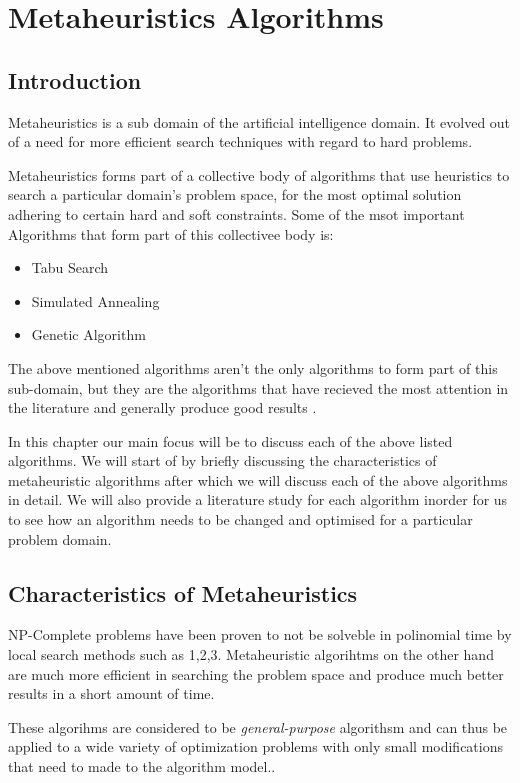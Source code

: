 \chapter{Metaheuristics Algorithms}

\section{Introduction}
Metaheuristics is a sub domain of the artificial intelligence domain. It evolved out of a need for more efficient search techniques with regard to hard problems. 

Metaheuristics forms part of a collective body of algorithms that use heuristics to search a particular domain's problem space, for the most optimal solution adhering to certain hard and soft constraints. Some of the msot important Algorithms that form part of this collectivee body is:
\begin{itemize}
\item Tabu Search
\item Simulated Annealing
\item Genetic Algorithm
\end{itemize}
The above mentioned algorithms aren't the only algorithms to form part of this sub-domain, but they are the algorithms that have recieved the most attention in the literature and generally produce good results \cite{SweepMeta}.

In this chapter our main focus will be to discuss each of the above listed algorithms. We will start of by briefly discussing the characteristics of metaheuristic algorithms after which we will discuss each of the above algorithms in detail. We will also provide a literature study for each algorithm inorder for us to see how an algorithm needs to be changed and optimised for a particular problem domain. 

\section{Characteristics of Metaheuristics}
NP-Complete problems have been proven to not be solveble in polinomial time by local search methods such as 1,2,3. Metaheuristic algorihtms on the other hand are much more efficient in searching the problem space and produce much better results in a short amount of time. 

These algorihms are considered to be \emph{general-purpose} algorithsm and can thus be applied to a wide variety of optimization problems with only small modifications that need to made to the algorithm model.\cite{MetaGraph}.

